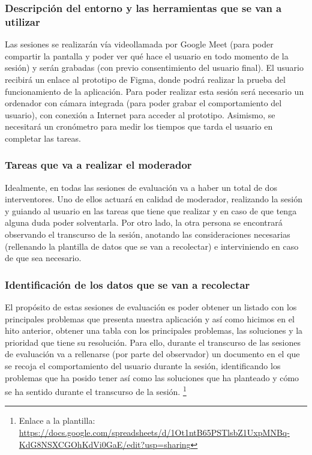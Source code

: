 \subsubsection{Descripción del entorno y las herramientas que se van a utilizar}
Las sesiones se realizarán vía videollamada por Google Meet (para poder compartir la pantalla y poder ver qué hace el usuario en todo momento de la sesión) y 
serán grabadas (con previo consentimiento del usuario final). El usuario recibirá un enlace al prototipo de Figma, donde podrá realizar la prueba del funcionamiento 
de la aplicación. Para poder realizar esta sesión será necesario un ordenador con cámara integrada (para poder grabar el comportamiento del usuario), con conexión 
a Internet para acceder al prototipo. Asimismo, se necesitará un cronómetro para medir los tiempos que tarda el usuario en completar las tareas.

\subsubsection{Tareas que va a realizar el moderador}
Idealmente, en todas las sesiones de evaluación va a haber un total de dos interventores. Uno de ellos actuará en calidad de moderador, realizando la sesión 
y guiando al usuario en las tareas que tiene que realizar y en caso de que tenga alguna duda poder solventarla. Por otro lado, la otra persona se encontrará 
observando el transcurso de la sesión, anotando las consideraciones necesarias (rellenando la plantilla de datos que se van a recolectar) e interviniendo en 
caso de que sea necesario.

\subsubsection{Identificación de los datos que se van a recolectar}
El propósito de estas sesiones de evaluación es poder obtener un listado con los principales problemas que presenta nuestra aplicación y así como hicimos en el hito
anterior, obtener una tabla con los principales problemas, las soluciones y la prioridad que tiene su resolución. Para ello, durante el transcurso de las sesiones de evaluación
va a rellenarse (por parte del observador) un documento en el que se recoja el comportamiento del usuario durante la sesión, identificando los problemas que ha posido tener
así como las soluciones que ha planteado y cómo se ha sentido durante el transcurso de la sesión. \footnote{Enlace a la plantilla: \url{https://docs.google.com/spreadsheets/d/1Ot1ntB65PSTlsbZ1UxpMNBq-KdG8NSXCGOhKdVi0GaE/edit?usp=sharing}} \\

